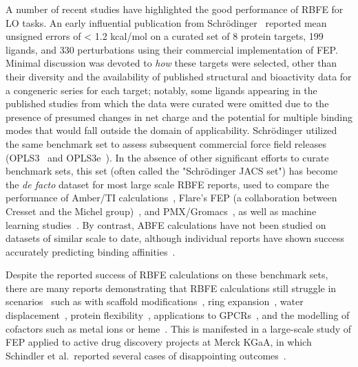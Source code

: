 \documentclass[9pt,bestpractices]{livecoms}
\begin{document}
A number of recent studies have highlighted the good performance of RBFE for LO tasks. 
An early influential publication from Schr\"{o}dinger~\cite{wangAccurateReliablePrediction2015} reported mean unsigned errors of < 1.2 kcal/mol on a curated set of 8 protein targets, 199 ligands, and 330 perturbations using their commercial implementation of FEP.
Minimal discussion was devoted to \emph{how} these targets were selected, other than their diversity and the availability of published structural and bioactivity data for a congeneric series for each target; notably, some ligands appearing in the published studies from which the data were curated were omitted due to the presence of presumed changes in net charge and the potential for multiple binding modes that would fall outside the domain of applicability.
Schr\"{o}dinger utilized the same benchmark set to assess subsequent commercial force field releases (OPLS3~\cite{harder_opls3_2016} and OPLS3e~\cite{roos_opls3e_2019}). 
In the absence of other significant efforts to curate benchmark sets, this set (often called the "Schr\"{o}dinger JACS set") has become the \emph{de facto} dataset for most large scale RBFE reports, used to compare the performance of Amber/TI calculations~\cite{songUsingAMBER18Relative2019}, Flare’s FEP (a collaboration between Cresset and the Michel group)~\cite{kuhnAssessmentBindingAffinity2020}, and PMX/Gromacs~\cite{gapsysLargeScaleRelative2020}, as well as machine learning studies~\cite{jimenezDEEPProteinLigand2018,jimenez-lunaDeltaDeltaNeuralNetworks2019}. 
By contrast, ABFE calculations have not been studied on datasets of similar scale to date, although individual reports have shown success accurately predicting binding affinities~\cite{aldeghiLargescaleAnalysisWater2018,courniaRigorousFreeEnergy2020}.

Despite the reported success of RBFE calculations on these benchmark sets, there are many reports demonstrating that RBFE calculations still struggle in scenarios~\cite{sherborne_collaborating_2016} such as with scaffold modifications~\cite{wangAccurateModelingScaffold2017}, ring expansion~\cite{liuRingBreakingFeasible2015}, water displacement~\cite{michel_energetics_2009,brucemacdonald_ligand_2018,ross_enhancing_2020a,ben-shalom_accounting_2020}, protein flexibility~\cite{huang_insights_2012,fratev_improved_2019,singh_absolute_2020}, applications to GPCRs~\cite{lenselink_predicting_2016,deflorian_accurate_2020}, and the modelling of cofactors such as metal ions or heme~\cite{swiderek_binding_2011,ono_improvement_2020}. 
This is manifested in a large-scale study of FEP applied to active drug discovery projects at Merck KGaA, in which Schindler et al.\ reported several cases of disappointing outcomes~\cite{schindler_largescale_2020}. 
\end{document}
